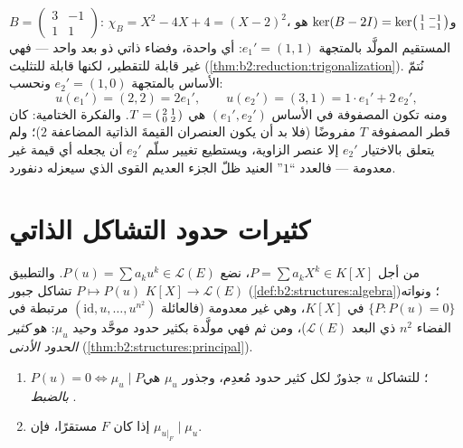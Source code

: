 \begin{example}\label{ex:b2:reduction:trigwork}
$B = \begin{pmatrix}3 & -1\\ 1 & 1\end{pmatrix}$: $\chi_B = X^2 -
4X + 4 = (X - 2)^2$، و$\ker(B - 2I) =
\ker\begin{psmallmatrix}1 & -1\\ 1 & -1\end{psmallmatrix}$ هو
المستقيم المولَّد بالمتجهة $e_1' = (1, 1)$: أي  واحدة، وفضاء ذاتي
ذو بعد واحد --- فهي غير قابلة للتقطير، لكنها
قابلة للتثليث (\cref{thm:b2:reduction:trigonalization}).
نُتمّ الأساس بالمتجهة $e_2' = (1, 0)$ ونحسب:
\[
u(e_1') = (2, 2) = 2e_1',
\qquad
u(e_2') = (3, 1) = 1\cdot e_1' + 2\, e_2' ,
\]
ومنه تكون المصفوفة في الأساس $(e_1', e_2')$ هي $T =
\begin{psmallmatrix}2 & 1\\ 0 & 2\end{psmallmatrix}$. والفكرة
الختامية: كان قطر المصفوفة $T$ مفروضًا (فلا بد أن يكون العنصران
القيمةَ الذاتية المضاعفة $2$)؛ ولم يتعلق بالاختيار $e_2'$
إلا عنصر الزاوية، ويستطيع تغيير سلّم $e_2'$ أن يجعله
أي قيمة غير معدومة --- فالعدد ``$1$'' العنيد ظلّ
الجزء العديم القوى الذي سيعزله دنفورد.
\end{example}

\section{كثيرات حدود التشاكل الذاتي}

\begin{definition}\label{def:b2:reduction:polyu}
من أجل $P = \sum a_k X^k \in K[X]$، نضع $P(u) = \sum a_k u^k \in
\mathcal{L}(E)$. والتطبيق $P \mapsto P(u)$ تشاكل جبور
$K[X] \to \mathcal{L}(E)$ (\cref{def:b2:structures:algebra})؛
ونواته $\{P : P(u) = 0\}$  في $K[X]$، وهي غير معدومة (فالعائلة
$(\mathrm{id}, u, \dots, u^{n^2})$ مرتبطة في الفضاء
$n^2$ ذي البعد $\mathcal{L}(E)$)، ومن ثم فهي مولَّدة بكثير حدود موحَّد
وحيد $\mu_u$: هو \emph{كثير الحدود
الأدنى}
(\cref{thm:b2:structures:principal}).
\end{definition}

\begin{proposition}\label{prop:b2:reduction:minpoly}
\begin{enumerate}
  \item $P(u) = 0 \iff \mu_u \mid P$؛  للتشاكل $u$ جذورٌ
        لكل كثير حدود مُعدِم، وجذور $\mu_u$
        هي \emph{بالضبط} .
  \item إذا كان $F$ مستقرًا، فإن $\mu_{u|_F} \mid \mu_u$.
\end{enumerate}
\end{proposition}

